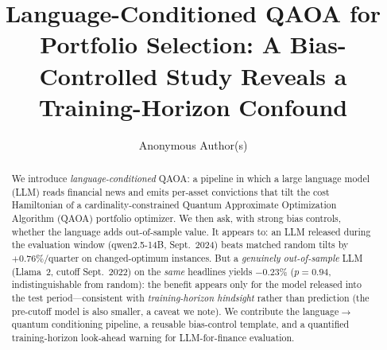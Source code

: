 \documentclass[runningheads]{llncs}
\begin{document}
\title{Language-Conditioned QAOA for Portfolio Selection: A Bias-Controlled Study Reveals a
Training-Horizon Confound}
\author{Anonymous Author(s)}
\maketitle

\begin{abstract}
We introduce \emph{language-conditioned} QAOA: a pipeline in which a large language model (LLM) reads
financial news and emits per-asset convictions that tilt the cost Hamiltonian of a cardinality-constrained
Quantum Approximate Optimization Algorithm (QAOA) portfolio optimizer. We then ask, with strong bias
controls, whether the language adds out-of-sample value.
It appears to: an LLM released during the evaluation window (qwen2.5-14B, Sept.\ 2024) beats
matched random tilts by $+0.76\%$/quarter on changed-optimum instances. But a \emph{genuinely out-of-sample} LLM
(Llama~2, cutoff Sept.\ 2022) on the \emph{same} headlines yields $-0.23\%$ ($p=0.94$, indistinguishable
from random): the benefit appears only for the model released into the test period---consistent
with \emph{training-horizon hindsight} rather than prediction (the pre-cutoff model is also smaller, a
caveat we note). We contribute the language$\to$quantum conditioning pipeline, a reusable bias-control
template, and a quantified training-horizon look-ahead warning for LLM-for-finance evaluation.
\end{abstract}
\end{document}
